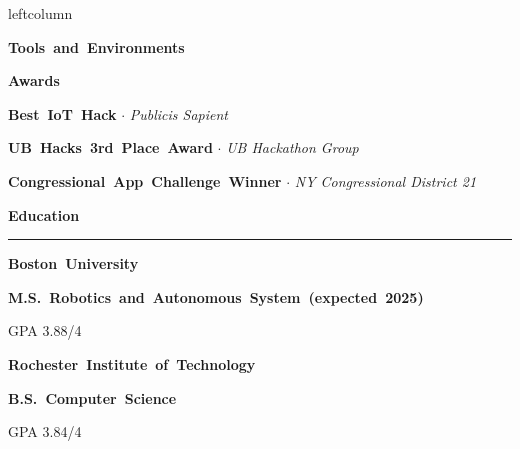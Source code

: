 \documentclass{article}
\newcommand{\rSection}[1] {
  \textcolor{header-blue} {
    \textbf{{\fontsize{0.5cm}{0.45cm}\selectfont \hbox{#1}}} \\
    \rule{0.30\textwidth}{0.1cm}
  }
}
\newcommand{\rSubSection}[1] {
  \textbf{{\fontsize{0.4cm}{0.45cm}\selectfont \hbox{#1}}}
}
\newcommand{\rSubSubSection}[1] {
  \textbf{{\fontsize{0.35cm}{0.45cm}\selectfont \hbox{#1}}}
}
\newcommand\level[2]{%
  \tikz{%
    \ifx#20
    \else
      \foreach \i in {1,...,#2} {
        \filldraw[black!20] (\i ex,0) circle (0.4ex);
      };
    \fi
    \ifx#10
    \else
      \foreach \i in {1,...,#1} {
        \filldraw[black] (\i ex,0) circle (0.4ex);
      };
    \fi
  }
}
\begin{document}
\begin{dynamiccontents*}{leftcolumn}
    \rSubSection{Tools and Environments} \par \bigskip
    \vspace{-10pt}

    \rSubSection{Awards} \par

\rSubSubSection{Best IoT Hack} $ \cdot $ \textit{Publicis Sapient} \par

\rSubSubSection{UB Hacks 3rd Place Award} $ \cdot $ \textit{UB Hackathon Group} \par

\rSubSubSection{Congressional App Challenge Winner} $ \cdot $ \textit{NY Congressional District 21} \par

\end{dynamiccontents*}

\rSection{Education} \par
\rSubSubSection{Boston University} \par
\rSubSubSection{M.S. Robotics and Autonomous System (expected 2025)} \par
GPA 3.88/4 \par

\rSubSubSection{Rochester Institute of Technology} \par
\rSubSubSection{B.S. Computer Science} \par
GPA 3.84/4 \par
\end{document}
